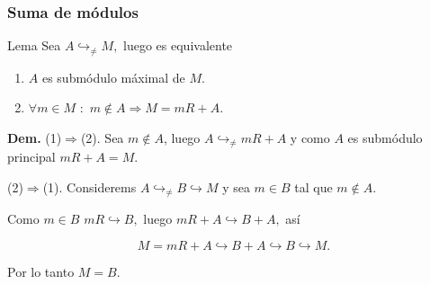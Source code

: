 \documentclass[notes=show]{beamer}%
\newenvironment{Lema}{\begin{block}{Lema}}{\end{block}}
\begin{document}
\begin{frame}%


\bigskip%
\frametitle{Suma de módulos}%


\begin{Lema}
\bigskip Sea $A\hookrightarrow_{\neq}M,$ luego es equivalente

\begin{enumerate}
\item $A$ es submódulo máximal de $M.$

\item $\forall m\in M$ $:$ $m\notin A\Rightarrow M=mR+A$.
\end{enumerate}
\end{Lema}

\bigskip\textbf{Dem. }(1)$\Rightarrow$(2). Sea $m\notin A$, luego
$A\hookrightarrow_{\neq}mR+A$ y como $A$ es submódulo principal $mR+A=M$.

(2)$\Rightarrow$(1). Considerems $A\hookrightarrow_{\neq}B\hookrightarrow M$ y
sea $m\in B$ tal que $m\notin A.$

\bigskip

Como $m\in B$ $mR\hookrightarrow B,$ luego $mR+A\hookrightarrow B+A,$ así

%

\[
M=mR+A\hookrightarrow B+A\hookrightarrow B\hookrightarrow M.
\]


\bigskip

Por lo tanto $M=B$.

\bigskip%

\transboxout
\end{frame}%


\bigskip%
\end{document}
